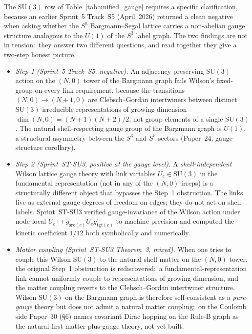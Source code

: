 \documentclass[11pt]{article}
\begin{document}
The $\mathrm{SU}(3)$ row of Table~\ref{tab:unified_gauge} requires a
specific clarification, because an earlier Sprint~5 Track~S5
(April~2026)
returned a clean negative when asking whether the $S^5$
Bargmann--Segal lattice carries a non-abelian gauge structure
analogous to the $U(1)$ of the $S^3$ label graph.  The two findings are not in tension:\
they answer two different questions, and read together they give a
two-step honest picture.

\begin{itemize}\setlength{\itemsep}{2pt}
\item \emph{Step 1 (Sprint~5 Track~S5, negative).}  An
adjacency-preserving $\mathrm{SU}(3)$ action on the $(N, 0)$ tower of
the Bargmann graph fails Wilson's fixed-group-on-every-link
requirement, because the transitions $(N, 0) \to (N+1, 0)$ are
Clebsch--Gordan intertwiners between distinct $\mathrm{SU}(3)$
irreducible representations of growing dimension $\dim(N, 0) =
(N+1)(N+2)/2$, not group elements of a single $\mathrm{SU}(3)$.  The
natural shell-respecting gauge group of the Bargmann graph is
$U(1)$, a structural asymmetry between the $S^3$ and $S^5$ sectors
(Paper~24, gauge-structure corollary).
\item \emph{Step 2 (Sprint~ST-SU3, positive at the gauge level).}  A
\emph{shell-independent} Wilson lattice gauge theory with link
variables $U_e \in \mathrm{SU}(3)$ in the fundamental representation
(not in any of the $(N, 0)$ irreps) is a structurally different
object that bypasses the Step~1 obstruction.  The links live as
external gauge degrees of freedom on edges; they do not act on
shell labels.  Sprint~ST-SU3 verified gauge-invariance of the
Wilson action under node-local
$U_e \mapsto g_{\mathrm{src}(e)} U_e g_{\mathrm{tgt}(e)}^{\dagger}$
to machine precision and computed the kinetic coefficient $1/12$
both symbolically and numerically.
\item \emph{Matter coupling (Sprint~ST-SU3 Theorem~3, mixed).}  When
one tries to couple this Wilson $\mathrm{SU}(3)$ to the natural
shell matter on the $(N, 0)$ tower, the original Step~1 obstruction
is rediscovered:\ a fundamental-representation link cannot uniformly
couple to representations of growing dimension, and the matter
coupling reverts to the Clebsch--Gordan intertwiner structure.
Wilson $\mathrm{SU}(3)$ on the Bargmann graph is therefore
self-consistent as a \emph{pure-gauge} theory but does not admit a
natural matter coupling;\ on the Coulomb side Paper~30 (\S 6) names
covariant Dirac hopping on the Rule-B graph as the natural first
matter-plus-gauge theory, not yet built.
\end{itemize}
\end{document}
